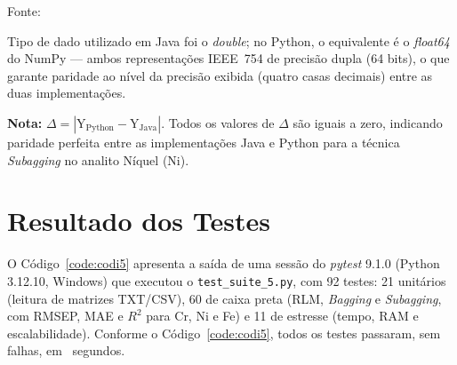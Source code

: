 \begin{table}[H]
\begin{threeparttable}
\begin{center}
\begin{minipage}{0.85\linewidth}
\begin{tablenotes}
\footnotesize
\item Fonte:~\oautor
\item[a] Tipo de dado utilizado em Java foi o \textit{double}; no Python,
o equivalente é o \textit{float64} do NumPy — ambos representações IEEE~754
de precisão dupla (64 bits), o que garante paridade ao nível da precisão exibida (quatro casas decimais) entre as
duas implementações.
\item \textbf{Nota:} $\Delta = |\text{Y}_{\text{Python}} - \text{Y}_{\text{Java}}|$.
Todos os valores de $\Delta$ são iguais a zero, indicando paridade
perfeita entre as implementações Java e Python para a técnica \textit{Subagging}
no analito Níquel (Ni).
\end{tablenotes}
\end{minipage}
\end{center}
\end{threeparttable}
\end{table}


\chapter{Resultado dos Testes}
\label{cha:resultadotestes}


O Código~\ref{code:codi5} apresenta a saída de uma sessão do \textit{pytest} 9.1.0 (Python 3.12.10, Windows) que executou o \texttt{test\_suite\_5.py}, com 92 testes: 21 unitários (leitura de matrizes TXT/CSV), 60 de caixa preta (RLM, \textit{Bagging} e \textit{Subagging}, com RMSEP, MAE e $R^2$ para Cr, Ni e Fe) e 11 de estresse (tempo, RAM e escalabilidade). Conforme o Código~\ref{code:codi5}, todos os testes passaram, sem falhas, em \testes~segundos.

